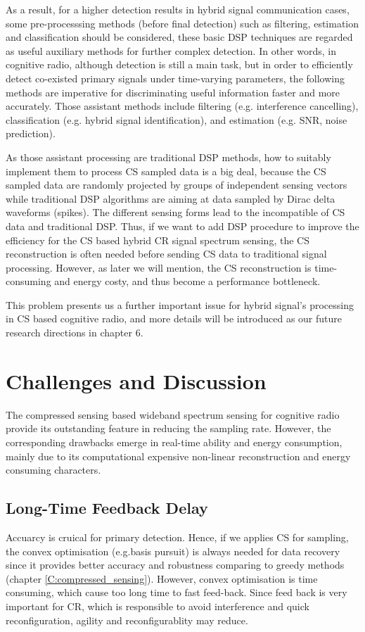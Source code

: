 As a result, for a higher detection results in hybrid signal communication cases, some pre-processsing methods (before final detection) such as filtering, estimation and classification should be considered, these basic DSP techniques are regarded as useful auxiliary methods for further complex detection. In other words, in cognitive radio, although detection is still a main task, but 
in order to efficiently detect co-existed primary signals under time-varying parameters, the following methods are imperative for discriminating useful information faster and more accurately. Those assistant methods include filtering (e.g. interference cancelling),  classification (e.g. hybrid signal identification), and estimation (e.g. SNR, noise prediction). 

As those assistant processing are traditional DSP methods, how to suitably implement them to process CS sampled data is a big deal, because the CS sampled data are randomly projected by groups of independent sensing vectors while traditional DSP algorithms are aiming at data sampled by Dirac delta waveforms (spikes). The different sensing forms lead to the incompatible of CS data and traditional DSP. Thus, if we want to add DSP procedure to improve the efficiency for the CS based hybrid CR signal spectrum sensing, the CS reconstruction is often needed before sending CS data to traditional signal processing. However, as later we will mention, the CS reconstruction is time-consuming and energy costy, and thus become a performance bottleneck.

This problem presents us a further important issue for hybrid signal's processing in CS based cognitive radio, and more details will be introduced as our future research directions in chapter 6. 

\section{Challenges and Discussion}

The compressed sensing based wideband spectrum sensing for cognitive radio provide its outstanding feature in reducing the sampling rate. However, the corresponding drawbacks emerge in real-time ability and energy consumption, mainly due to its computational expensive non-linear reconstruction and energy consuming characters. 

\subsection{Long-Time Feedback Delay}
Accuarcy is cruical for primary detection. Hence, if we applies CS for sampling, the convex optimisation (e.g.basis pursuit) is always needed for data recovery since it provides better accuracy and robustness comparing to greedy methods (chapter \ref{C:compressed_sensing}). However, convex optimisation is time consuming, which cause too long time to fast feed-back. Since feed back is very important for CR, which is responsible to avoid interference and quick reconfiguration, agility and reconfigurablity may reduce.

